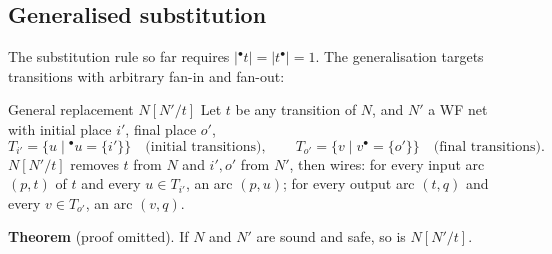 \subsection{Generalised substitution}

The substitution rule so far requires $|{}^\bullet t| = |t^\bullet| = 1$. The generalisation targets transitions with arbitrary fan-in and fan-out:
\begin{center}
\end{center}

\begin{definitionbox}{General replacement $N[N'/t]$}
Let $t$ be any transition of $N$, and $N'$ a WF net with initial place $i'$, final place $o'$,
\[
  T_{i'} = \{u \mid {}^\bullet u = \{i'\}\} \quad \text{(initial transitions)}, \qquad
  T_{o'} = \{v \mid v^\bullet = \{o'\}\} \quad \text{(final transitions)}.
\]
$N[N'/t]$ removes $t$ from $N$ and $i', o'$ from $N'$, then wires: for every input arc $(p, t)$ of $t$ and every $u \in T_{i'}$, an arc $(p, u)$; for every output arc $(t, q)$ and every $v \in T_{o'}$, an arc $(v, q)$.
\par\smallskip
\textbf{Theorem} (proof omitted). If $N$ and $N'$ are sound and safe, so is $N[N'/t]$.
\end{definitionbox}

